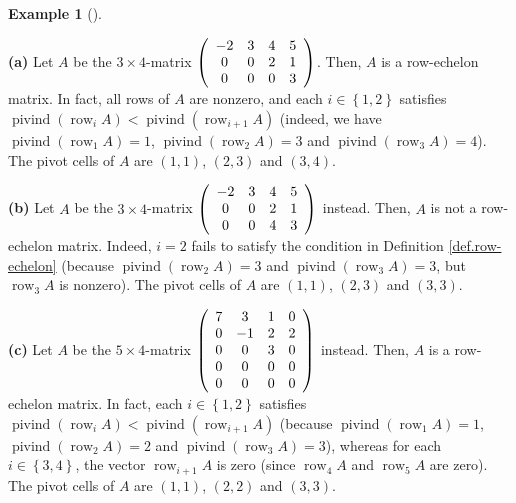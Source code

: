 \documentclass[numbers=enddot,12pt,final,onecolumn,notitlepage]{scrartcl}%
\theoremstyle{definition}
\newtheorem{exam}[theo]{Example}
\newenvironment{example}[1][]
{\begin{exam}[#1]\begin{leftbar}}
{\end{leftbar}\end{exam}}
\begin{document}
\begin{example}
\label{exam.row-echelon}\textbf{(a)} Let $A$ be the $3\times4$-matrix $\left(
%
\begin{array}
[c]{cccc}%
-2 & 3 & 4 & 5\\
0 & 0 & 2 & 1\\
0 & 0 & 0 & 3
\end{array}
\right)  $. Then, $A$ is a row-echelon matrix. In fact, all rows of $A$ are
nonzero, and each $i\in\left\{  1,2\right\}  $ satisfies
$\operatorname*{pivind}\left(  \operatorname*{row}\nolimits_{i}A\right)
<\operatorname*{pivind}\left(  \operatorname*{row}\nolimits_{i+1}A\right)  $
(indeed, we have $\operatorname*{pivind}\left(  \operatorname*{row}%
\nolimits_{1}A\right)  =1$, $\operatorname*{pivind}\left(  \operatorname*{row}%
\nolimits_{2}A\right)  =3$ and $\operatorname*{pivind}\left(
\operatorname*{row}\nolimits_{3}A\right)  =4$). The pivot cells of $A$ are
$\left(  1,1\right)  $, $\left(  2,3\right)  $ and $\left(  3,4\right)  $.

\textbf{(b)} Let $A$ be the $3\times4$-matrix $\left(
\begin{array}
[c]{cccc}%
-2 & 3 & 4 & 5\\
0 & 0 & 2 & 1\\
0 & 0 & 4 & 3
\end{array}
\right)  $ instead. Then, $A$ is not a row-echelon matrix. Indeed, $i=2$ fails
to satisfy the condition in Definition \ref{def.row-echelon} (because
$\operatorname*{pivind}\left(  \operatorname*{row}\nolimits_{2}A\right)  =3$
and $\operatorname*{pivind}\left(  \operatorname*{row}\nolimits_{3}A\right)
=3$, but $\operatorname*{row}\nolimits_{3}A$ is nonzero). The pivot cells of
$A$ are $\left(  1,1\right)  $, $\left(  2,3\right)  $ and $\left(
3,3\right)  $.

\textbf{(c)} Let $A$ be the $5\times4$-matrix $\left(
\begin{array}
[c]{cccc}%
7 & 3 & 1 & 0\\
0 & -1 & 2 & 2\\
0 & 0 & 3 & 0\\
0 & 0 & 0 & 0\\
0 & 0 & 0 & 0
\end{array}
\right)  $ instead. Then, $A$ is a row-echelon matrix. In fact, each
$i\in\left\{  1,2\right\}  $ satisfies $\operatorname*{pivind}\left(
\operatorname*{row}\nolimits_{i}A\right)  <\operatorname*{pivind}\left(
\operatorname*{row}\nolimits_{i+1}A\right)  $ (because $\operatorname*{pivind}%
\left(  \operatorname*{row}\nolimits_{1}A\right)  =1$, $\operatorname*{pivind}%
\left(  \operatorname*{row}\nolimits_{2}A\right)  =2$ and
$\operatorname*{pivind}\left(  \operatorname*{row}\nolimits_{3}A\right)  =3$),
whereas for each $i\in\left\{  3,4\right\}  $, the vector $\operatorname*{row}%
\nolimits_{i+1}A$ is zero (since $\operatorname*{row}\nolimits_{4}A$ and
$\operatorname*{row}\nolimits_{5}A$ are zero). The pivot cells of $A$ are
$\left(  1,1\right)  $, $\left(  2,2\right)  $ and $\left(  3,3\right)  $.


\end{example}
\end{document}
